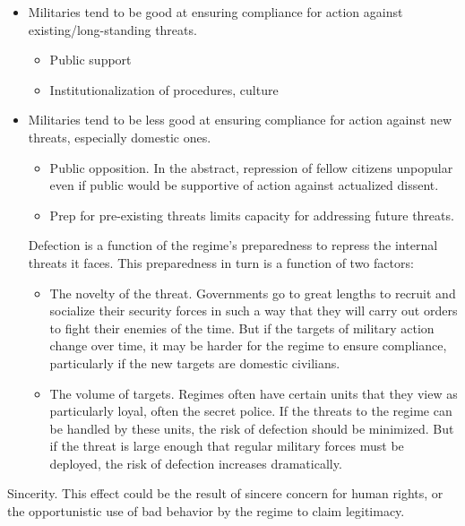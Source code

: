 \documentclass[12pt,]{article}
\providecommand{\tightlist}{%
  \setlength{\itemsep}{0pt}\setlength{\parskip}{0pt}}
\begin{document}
\begin{itemize}
\tightlist
\item
  Militaries tend to be good at ensuring compliance for action against existing/long-standing threats.

  \begin{itemize}
  \tightlist
  \item
    Public support
  \item
    Institutionalization of procedures, culture
  \end{itemize}
\item
  Militaries tend to be less good at ensuring compliance for action against new threats, especially domestic ones.

  \begin{itemize}
  \tightlist
  \item
    Public opposition. In the abstract, repression of fellow citizens unpopular even if public would be supportive of action against actualized dissent.
  \item
    Prep for pre-existing threats limits capacity for addressing future threats.
  \end{itemize}

  Defection is a function of the regime's preparedness to repress the internal threats it faces. This preparedness in turn is a function of two factors:

  \begin{itemize}
  \tightlist
  \item
    The novelty of the threat. Governments go to great lengths to recruit and socialize their security forces in such a way that they will carry out orders to fight their enemies of the time. But if the targets of military action change over time, it may be harder for the regime to ensure compliance, particularly if the new targets are domestic civilians.
  \item
    The volume of targets. Regimes often have certain units that they view as particularly loyal, often the secret police. If the threats to the regime can be handled by these units, the risk of defection should be minimized. But if the threat is large enough that regular military forces must be deployed, the risk of defection increases dramatically.
  \end{itemize}
\end{itemize}

Sincerity. This effect could be the result of sincere concern for human rights, or the opportunistic use of bad behavior by the regime to claim legitimacy.
\end{document}
